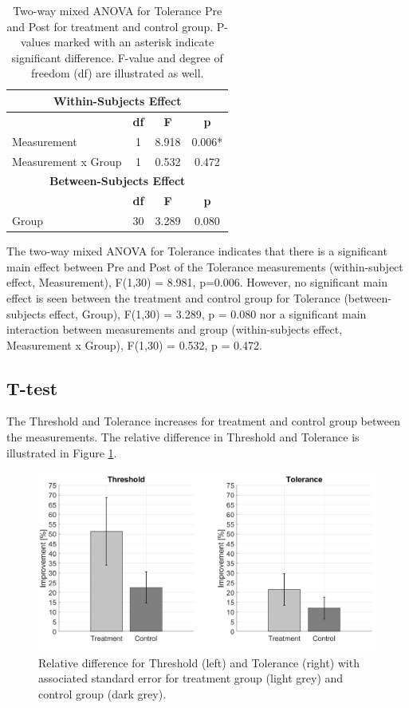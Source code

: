 \begin{table}[ht]
\caption{Two-way mixed ANOVA for Tolerance Pre and Post for treatment and control group. P-values marked with an asterisk indicate significant difference. F-value and degree of
freedom (df) are illustrated as well.}
\centering
\begin{tabular}{l c c c}
\toprule
\multicolumn{4}{c}{\textbf{Within-Subjects Effect}} \\
\midrule  
& \textbf{df} & \textbf{F} & \textbf{p} \\ [0.5ex] %
Measurement & 1 &  8.918 &  0.006* \\
Measurement x Group & 1 & 0.532 & 0.472 \\
\toprule
\multicolumn{4}{c}{\textbf{Between-Subjects Effect}} \\
\midrule
 & \textbf{df} & \textbf{F} & \textbf{p} \\ [0.5ex] %
Group & 30 & 3.289 &  0.080 \\
\hline
\end{tabular}
\label{table:TWOWAYANOVA2}
\end{table}


The two-way mixed ANOVA for Tolerance indicates that there is a significant main effect between Pre and Post of the Tolerance measurements (within-subject effect, Measurement), F(1,30) = 8.981, p=0.006. However, no significant main effect is seen between the treatment and control group for Tolerance (between-subjects effect, Group), F(1,30) = 3.289, p = 0.080 nor a significant main interaction between  measurements and group (within-subjects effect, Measurement x Group), F(1,30) = 0.532, p = 0.472.

\subsection{T-test}
The Threshold and Tolerance increases for treatment and control group between the measurements. The relative difference in Threshold and Tolerance is illustrated in Figure \ref{fig:barplot}. 

\begin{figure}[H]
\centering
\includegraphics[width=1\columnwidth]{../figures/barplot.png}
\caption{Relative difference for Threshold (left) and Tolerance (right) with associated standard error for treatment group (light grey) and control group (dark grey).}
\label{fig:barplot}
\end{figure} 

